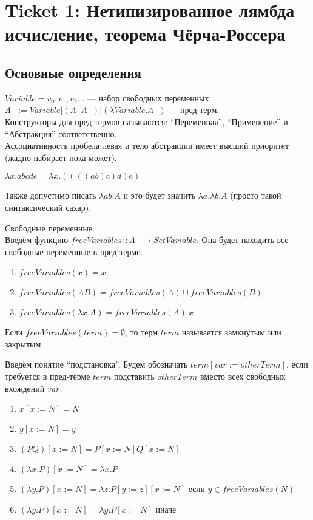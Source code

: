 \section{Ticket 1: Нетипизированное лямбда исчисление, теорема Чёрча-Россера}
\label{sec-2}
\subsection{Основные определения}
\label{sec-2-1}
$Variable = {v_0, v_1, v_2 \dots}$ --- набор свободных переменных. \\
$\Lambda^- := Variable | (\Lambda^- \Lambda^-) | (\lambda Variable . \Lambda^-)$ --- пред-терм. \\
Конструкторы для пред-термов называются: 
``Переменная'', ``Применение'' и ``Абстракция'' соответственно. \\
Ассоциативность пробела левая и тело абстракции имеет высший приоритет
(жадно набирает пока может).
\begin{example}
$\lambda x . a b c d e = \lambda x . ((((a b) c) d) e)$
\end{example}
Также допустимо писать $\lambda a b . A$ и это будет значить 
$\lambda a . \lambda b . A$ (просто такой синтаксический сахар).

Свободные переменные: \\
Введём функцию $freeVariables :: \Lambda^- \to Set Variable$.
Она будет находить все свободные переменные в пред-терме.
\begin{enumerate}
\item $freeVariables(x) = {x}$
\item $freeVariables(A B) = freeVariables(A) \cup freeVariables(B)$
\item $freeVariables(\lambda x . A) = freeVariables(A) \ {x}$
\end{enumerate}
Если $freeVariables(term) = \emptyset$, то терм $term$ называется замкнутым или
закрытым.

Введём понятие ``подстановка''. Будем обозначать $term[var:=otherTerm]$, если
требуется в пред-терме $term$ подставить $otherTerm$ вместо всех свободных
вхождений $var$.
\begin{enumerate}
\item $x[x:=N] = N$
\item $y[x:=N] = y$
\item $(P Q)[x:=N] = P[x:=N] Q[x:=N]$
\item $(\lambda x . P)[x:=N] = \lambda x . P$
\item $(\lambda y . P)[x:=N] = \lambda z . P[y:=z][x:=N]$ если $y \in freeVariables(N)$
\item $(\lambda y . P)[x:=N] = \lambda y . P[x:=N]$ иначе
\end{enumerate}
